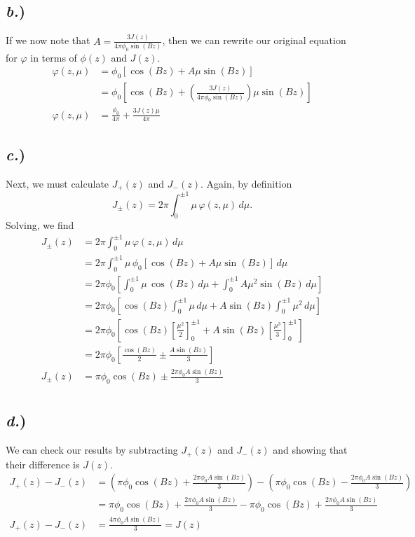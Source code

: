 \documentclass{article}
\begin{document}
\subsection*{\textit{b.})}

If we now note that $A = \frac{3J(z)}{4\pi\phi_0\sin(Bz)}$, then we can rewrite our original equation for $\varphi$ in terms of $\phi(z)$ and $J(z)$.
\begin{align*}
\varphi(z,\mu)	&= \phi_0 \left[\cos(Bz) + A \mu \sin(Bz)\right] \\
				&= \phi_0 \left[\cos(Bz) + \left(\frac{3J(z)}{4\pi\phi_0\sin(Bz)}\right) \mu \sin(Bz)\right]\\
\varphi(z,\mu)	&= \frac{\phi_0}{4\pi} + \frac{3J(z)\mu}{4\pi}
\end{align*}


\subsection*{\textit{c.})}

Next, we must calculate $J_{+}(z)$ and $J_{-}(z)$. Again, by definition
$$ J_{\pm}(z) = 2\pi \int_0^{\pm1} \mu \, \varphi(z,\mu) \, d\mu .$$
Solving, we find
\begin{align*}
J_{\pm}(z)	&= 2\pi \int_0^{\pm1} \mu \, \varphi(z,\mu) \, d\mu \\
			&= 2\pi \int_0^{\pm1} \mu \, \phi_0 \left[\cos(Bz) + A \mu \sin(Bz)\right] \, d\mu \\
			&= 2\pi\phi_0 \left[ \int_0^{\pm1} \mu \, \cos(Bz) \, d\mu + \int_0^{\pm1} A \mu^2 \sin(Bz) \, d\mu \right] \\ 
			&= 2\pi\phi_0 \left[ \cos(Bz) \int_0^{\pm1} \mu \, d\mu + A \sin(Bz) \int_0^{\pm1} \mu^2 \, d\mu \right] \\ 
			&= 2\pi\phi_0 \left[ \cos(Bz) \left[ \frac{\mu^2}{2} \right]_0^{\pm1} + A \sin(Bz) \left[ \frac{\mu^3}{3} \right]_0^{\pm1} \right] \\ 
			&= 2\pi\phi_0 \left[ \frac{\cos(Bz)}{2} \pm \frac{A \sin(Bz)}{3} \right] \\
J_{\pm}(z)	&= \pi\phi_0\cos(Bz) \pm \frac{2\pi\phi_0 A \sin(Bz)}{3} \\ 
\end{align*}


\subsection*{\textit{d.})}

We can check our results by subtracting $J_{+}(z)$ and $J_{-}(z)$ and showing that their difference is $J(z)$. 
\begin{align*}
J_{+}(z) - J_{-}(z)	&= \left(\pi\phi_0\cos(Bz) + \frac{2\pi\phi_0 A \sin(Bz)}{3}\right) - \left(\pi\phi_0\cos(Bz) - \frac{2\pi\phi_0 A \sin(Bz)}{3}\right) \\
					&= \pi\phi_0\cos(Bz) + \frac{2\pi\phi_0 A \sin(Bz)}{3} - \pi\phi_0\cos(Bz) + \frac{2\pi\phi_0 A \sin(Bz)}{3} \\
J_{+}(z) - J_{-}(z)	&= \frac{4\pi\phi_0 A \sin(Bz)}{3} = J(z)
\end{align*}
\end{document}
